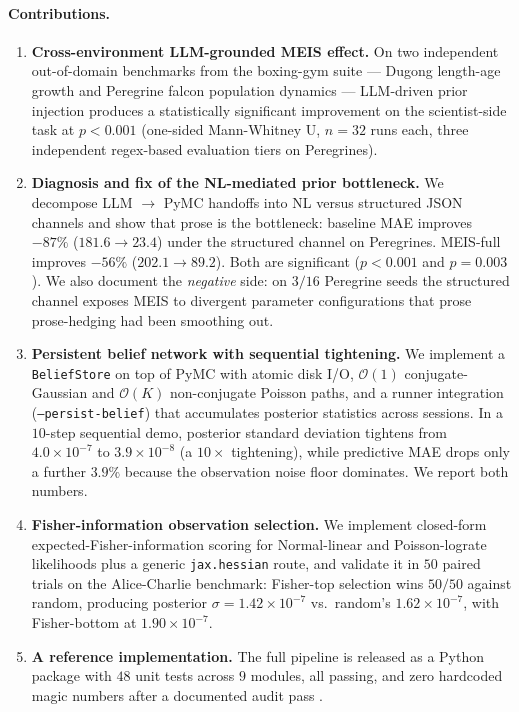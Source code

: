 \documentclass{article}
\begin{document}
\paragraph{Contributions.}
\begin{enumerate}[leftmargin=*, itemsep=2pt]
\item \textbf{Cross-environment LLM-grounded MEIS effect.} On two
independent out-of-domain benchmarks from the boxing-gym suite
\citep{li2025boxinggym} --- Dugong length-age growth and Peregrine
falcon population dynamics --- LLM-driven prior injection produces a
statistically significant improvement on the scientist-side task at
$p < 0.001$ (one-sided Mann-Whitney U, $n = 32$ runs each, three
independent regex-based evaluation tiers on Peregrines).

\item \textbf{Diagnosis and fix of the NL-mediated prior bottleneck.}
We decompose LLM $\to$ PyMC handoffs into NL versus structured
JSON channels and show that prose is the bottleneck: baseline MAE
improves $-87\%$ ($181.6 \to 23.4$) under the structured channel on
Peregrines. MEIS-full improves $-56\%$ ($202.1 \to 89.2$).
Both are significant ($p < 0.001$ and $p = 0.003$). We also
document the \emph{negative} side: on $3/16$ Peregrine seeds the
structured channel exposes MEIS to divergent parameter
configurations that prose prose-hedging had been smoothing out.

\item \textbf{Persistent belief network with sequential tightening.}
We implement a \texttt{BeliefStore} on top of PyMC with atomic
disk I/O, $\mathcal{O}(1)$ conjugate-Gaussian and $\mathcal{O}(K)$
non-conjugate Poisson paths, and a runner integration
(\texttt{--persist-belief}) that accumulates posterior statistics
across sessions. In a $10$-step sequential demo, posterior
standard deviation tightens from $4.0 \times 10^{-7}$ to
$3.9 \times 10^{-8}$ (a $10\times$ tightening), while predictive MAE
drops only a further $3.9\%$ because the observation noise floor
dominates. We report both numbers.

\item \textbf{Fisher-information observation selection.} We
implement closed-form expected-Fisher-information scoring for
Normal-linear and Poisson-lograte likelihoods plus a generic
\texttt{jax.hessian} route, and validate it in $50$ paired trials on
the Alice-Charlie benchmark: Fisher-top selection wins
$50 / 50$ against random, producing posterior $\sigma =
1.42 \times 10^{-7}$ vs.\ random's $1.62 \times 10^{-7}$, with
Fisher-bottom at $1.90 \times 10^{-7}$.

\item \textbf{A reference implementation.} The full pipeline is
released as a Python package with $48$ unit tests across $9$
modules, all passing, and zero hardcoded magic numbers after a
documented audit pass \citep{Anonymous2026MEIS}.
\end{enumerate}
\end{document}
